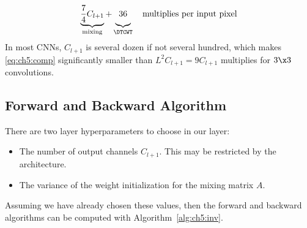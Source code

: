 \begin{equation}
  \underbrace{ \frac{7}{4}C_{l+1} }_{\textrm{mixing}} +
  \underbrace{\vphantom{\frac{7}{4}} 36}_{\DTCWT} \quad
  \textrm{multiplies per input pixel}\label{eq:ch5:comp}
\end{equation}
In most CNNs, $C_{l+1}$ is several dozen if not several
hundred, which makes \eqref{eq:ch5:comp} significantly smaller than
$L^2C_{l+1}=9C_{l+1}$ multiplies for $3\x 3$ convolutions.

\subsection{Forward and Backward Algorithm}
There are two layer hyperparameters to choose in our layer:
\begin{itemize}
  \item The number of output channels $C_{l+1}$. This may be restricted by the
    architecture.
  \item The variance of the weight initialization for the mixing matrix $A$.
\end{itemize}

Assuming we have already chosen these values, 
then the forward and backward algorithms can be computed with
Algorithm~\autoref{alg:ch5:inv}.

